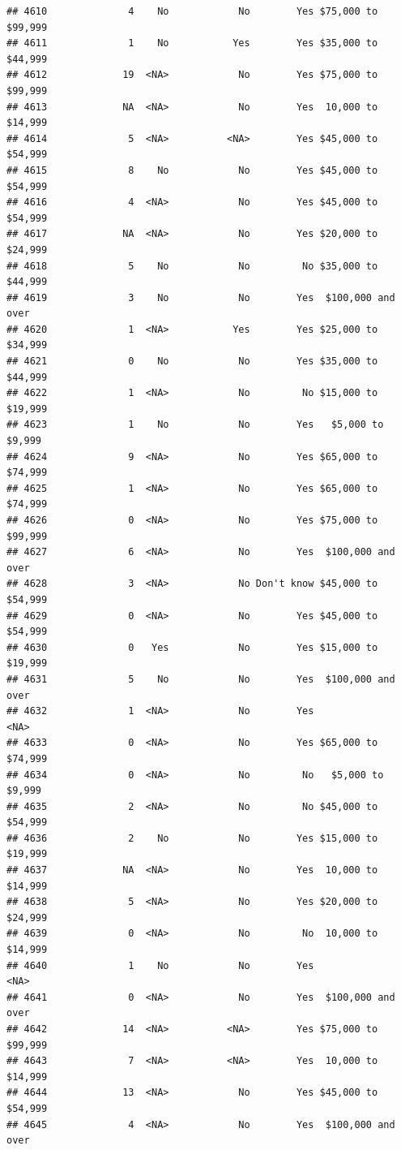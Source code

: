 \documentclass[man]{apa6}
\begin{document}
\begin{verbatim}
## 4610              4    No            No        Yes $75,000 to $99,999
## 4611              1    No           Yes        Yes $35,000 to $44,999
## 4612             19  <NA>            No        Yes $75,000 to $99,999
## 4613             NA  <NA>            No        Yes  10,000 to $14,999
## 4614              5  <NA>          <NA>        Yes $45,000 to $54,999
## 4615              8    No            No        Yes $45,000 to $54,999
## 4616              4  <NA>            No        Yes $45,000 to $54,999
## 4617             NA  <NA>            No        Yes $20,000 to $24,999
## 4618              5    No            No         No $35,000 to $44,999
## 4619              3    No            No        Yes  $100,000 and over
## 4620              1  <NA>           Yes        Yes $25,000 to $34,999
## 4621              0    No            No        Yes $35,000 to $44,999
## 4622              1  <NA>            No         No $15,000 to $19,999
## 4623              1    No            No        Yes   $5,000 to $9,999
## 4624              9  <NA>            No        Yes $65,000 to $74,999
## 4625              1  <NA>            No        Yes $65,000 to $74,999
## 4626              0  <NA>            No        Yes $75,000 to $99,999
## 4627              6  <NA>            No        Yes  $100,000 and over
## 4628              3  <NA>            No Don't know $45,000 to $54,999
## 4629              0  <NA>            No        Yes $45,000 to $54,999
## 4630              0   Yes            No        Yes $15,000 to $19,999
## 4631              5    No            No        Yes  $100,000 and over
## 4632              1  <NA>            No        Yes               <NA>
## 4633              0  <NA>            No        Yes $65,000 to $74,999
## 4634              0  <NA>            No         No   $5,000 to $9,999
## 4635              2  <NA>            No         No $45,000 to $54,999
## 4636              2    No            No        Yes $15,000 to $19,999
## 4637             NA  <NA>            No        Yes  10,000 to $14,999
## 4638              5  <NA>            No        Yes $20,000 to $24,999
## 4639              0  <NA>            No         No  10,000 to $14,999
## 4640              1    No            No        Yes               <NA>
## 4641              0  <NA>            No        Yes  $100,000 and over
## 4642             14  <NA>          <NA>        Yes $75,000 to $99,999
## 4643              7  <NA>          <NA>        Yes  10,000 to $14,999
## 4644             13  <NA>            No        Yes $45,000 to $54,999
## 4645              4  <NA>            No        Yes  $100,000 and over

\end{verbatim}
\end{document}
